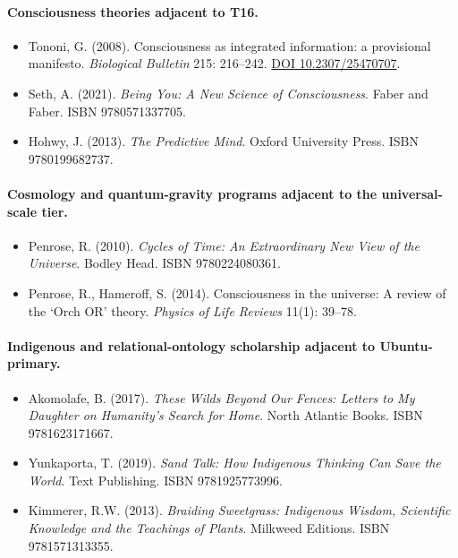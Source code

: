 \documentclass[11pt,a4paper]{article}
\begin{document}
\paragraph{Consciousness theories adjacent to T16.}
\begin{itemize}[leftmargin=*,itemsep=2pt]
\item Tononi, G. (2008). Consciousness as integrated information: a provisional manifesto. \emph{Biological Bulletin} 215: 216--242. \href{https://doi.org/10.2307/25470707}{DOI 10.2307/25470707}.
\item Seth, A. (2021). \emph{Being You: A New Science of Consciousness}. Faber and Faber. ISBN 9780571337705.
\item Hohwy, J. (2013). \emph{The Predictive Mind}. Oxford University Press. ISBN 9780199682737.
\end{itemize}

\paragraph{Cosmology and quantum-gravity programs adjacent to the universal-scale tier.}
\begin{itemize}[leftmargin=*,itemsep=2pt]
\item Penrose, R. (2010). \emph{Cycles of Time: An Extraordinary New View of the Universe}. Bodley Head. ISBN 9780224080361.
\item Penrose, R., Hameroff, S. (2014). Consciousness in the universe: A review of the `Orch OR' theory. \emph{Physics of Life Reviews} 11(1): 39--78.
\end{itemize}

\paragraph{Indigenous and relational-ontology scholarship adjacent to Ubuntu-primary.}
\begin{itemize}[leftmargin=*,itemsep=2pt]
\item Akomolafe, B. (2017). \emph{These Wilds Beyond Our Fences: Letters to My Daughter on Humanity's Search for Home}. North Atlantic Books. ISBN 9781623171667.
\item Yunkaporta, T. (2019). \emph{Sand Talk: How Indigenous Thinking Can Save the World}. Text Publishing. ISBN 9781925773996.
\item Kimmerer, R.W. (2013). \emph{Braiding Sweetgrass: Indigenous Wisdom, Scientific Knowledge and the Teachings of Plants}. Milkweed Editions. ISBN 9781571313355.
\end{itemize}
\end{document}
